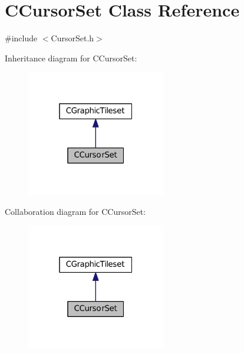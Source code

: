 \hypertarget{classCCursorSet}{}\section{C\+Cursor\+Set Class Reference}
\label{classCCursorSet}


{\ttfamily \#include $<$Cursor\+Set.\+h$>$}



Inheritance diagram for C\+Cursor\+Set\+:\nopagebreak
\begin{figure}[H]
\begin{center}
\leavevmode
\includegraphics[width=172pt]{classCCursorSet__inherit__graph}
\end{center}
\end{figure}


Collaboration diagram for C\+Cursor\+Set\+:\nopagebreak
\begin{figure}[H]
\begin{center}
\leavevmode
\includegraphics[width=172pt]{classCCursorSet__coll__graph}
\end{center}
\end{figure}
